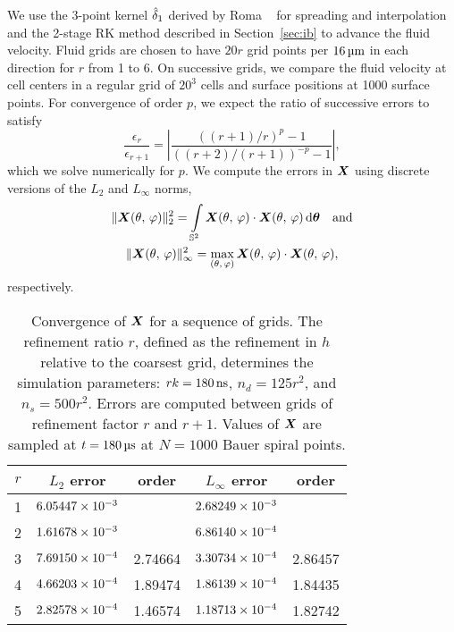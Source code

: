 We use the 3-point kernel $\hat{\delta}_1$ derived by Roma ~%
\cite{Roma:1999tx} for spreading and interpolation and the 2-stage RK method described in
Section~\ref{sec:ib} to advance the fluid velocity. Fluid grids are chosen to have $20r$
grid points per $16\um$ in each direction for $r$ from 1 to 6. On successive grids, we
compare the fluid velocity at cell centers in a regular grid of $20^3$ cells and surface
positions at 1000 surface points. For convergence of order $p$, we expect the ratio of
successive errors to satisfy
\begin{equation*}
    \frac{\epsilon_r}{\epsilon_{r+1}} = \left|\frac{((r+1)/r)^p-1}{((r+2)/(r+1))^{-p}-1}\right|,
\end{equation*}
which we solve numerically for $p$. We compute the errors in $\boldsymbol{X}$ using discrete versions
of the $L_2$ and $L_\infty$ norms,
\begin{gather}
    \|\X(\theta,\,\varphi)\|_2^2 =
    \int\limits_{\sphere} \X(\theta,\,\varphi)\cdot\X(\theta,\,\varphi) \d\qs \quad\text{and} \\
    \|\X(\theta,\,\varphi)\|_\infty^2 =
    \max_{(\theta,\,\varphi)} \X(\theta,\,\varphi)\cdot\X(\theta,\,\varphi),
\end{gather}
respectively.

\begin{table}[t!]
    \centering
    \caption[Convergence of surface positions for relaxing RBC test]{%
Convergence of $\boldsymbol{X}$ for a sequence of grids. The refinement ratio $r$, defined as the
refinement in $h$ relative to the coarsest grid, determines the simulation parameters:
$r\timestep = 180\ns$, $n_d = 125r^2$, and $n_s = 500r^2$. Errors are computed between
grids of refinement factor $r$ and $r+1$. Values of $\boldsymbol{X}$ are sampled at $t = 180\us$ at
$N=1000$ Bauer spiral points.
    }\label{tab:x-rbc-conv}
    \begingroup
    \setlength{\tabcolsep}{9pt}
    \renewcommand{\arraystretch}{1.5}
    \begin{tabular}{c|cc|cc}
                                                                                     \toprule
        $r$ & $L_2$ error            & order   & $L_\infty$ error       & order   \\ \midrule
        1   & ${6.05447}\times 10^{-3}$ &         & ${2.68249}\times 10^{-3}$ &         \\
        2   & ${1.61678}\times 10^{-3}$ &         & ${6.86140}\times 10^{-4}$ &         \\
        3   & ${7.69150}\times 10^{-4}$ & 2.74664 & ${3.30734}\times 10^{-4}$ & 2.86457 \\
        4   & ${4.66203}\times 10^{-4}$ & 1.89474 & ${1.86139}\times 10^{-4}$ & 1.84435 \\
        5   & ${2.82578}\times 10^{-4}$ & 1.46574 & ${1.18713}\times 10^{-4}$ & 1.82742 \\ \bottomrule
    \end{tabular}
    \endgroup
\end{table}

